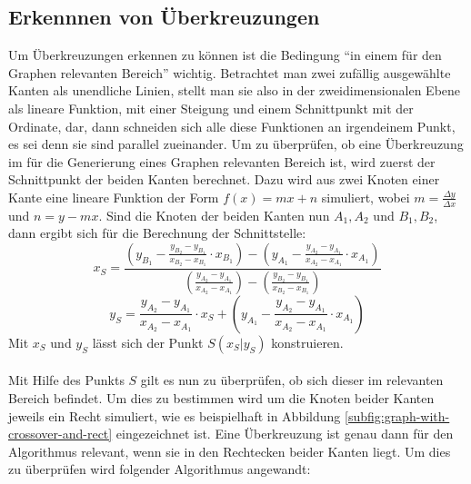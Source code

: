 \subsection{Erkennnen von Überkreuzungen}
Um Überkreuzungen erkennen zu können ist die Bedingung \enquote{in einem für den Graphen relevanten Bereich} wichtig.
Betrachtet man zwei zufällig ausgewählte Kanten als unendliche Linien, stellt man sie also in der zweidimensionalen Ebene als lineare Funktion, mit einer Steigung und einem Schnittpunkt mit der Ordinate, dar, dann schneiden sich alle diese Funktionen an irgendeinem Punkt, es sei denn sie sind parallel zueinander.
Um zu überprüfen, ob eine Überkreuzung im für die Generierung eines Graphen relevanten Bereich ist, wird zuerst der Schnittpunkt der beiden Kanten berechnet.
Dazu wird aus zwei Knoten einer Kante eine lineare Funktion der Form $f(x) =mx+n$ simuliert, wobei $m=\frac{\Delta y}{\Delta x}$ und $n=y - mx$.
Sind die Knoten der beiden Kanten nun $A_1,A_2$ und $B_1,B_2$, dann ergibt sich für die Berechnung der Schnittstelle:
\begin{equation}
    \label{eq:calculation-xs}
    x_S = \frac{(y_{B_1} - \frac{y_{B_2} - y_{B_1}}{x_{B_2} - x_{B_1}}\cdot x_{B_1}) - (y_{A_1} - \frac{y_{A_2} - y_{A_1}}{x_{A_2} - x_{A_1}}\cdot x_{A_1})}{(\frac{y_{A_2} - y_{A_1}}{x_{A_2} - x_{A_1}}) - (\frac{y_{B_2} - y_{B_1}}{x_{B_2} - x_{B_1}})} 
\end{equation}
\begin{equation}
    \label{eq:calculation-ys}
    y_S = \frac{y_{A_2} - y_{A_1}}{x_{A_2} - x_{A_1}}\cdot x_S + (y_{A_1} - \frac{y_{A_2} - y_{A_1}}{x_{A_2} - x_{A_1}}\cdot x_{A_1})
\end{equation}
Mit $x_S$ und $y_S$ lässt sich der Punkt $S(x_S|y_S)$ konstruieren.
\\\\
Mit Hilfe des Punkts $S$ gilt es nun zu überprüfen, ob sich dieser im relevanten Bereich befindet.
Um dies zu bestimmen wird um die Knoten beider Kanten jeweils ein Recht simuliert, wie es beispielhaft in Abbildung \vref{subfig:graph-with-crossover-and-rect} eingezeichnet ist.
Eine Überkreuzung ist genau dann für den Algorithmus relevant, wenn sie in den Rechtecken beider Kanten liegt.
Um dies zu überprüfen wird folgender Algorithmus angewandt:
